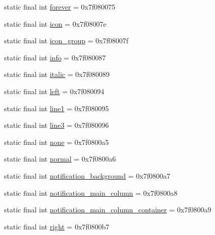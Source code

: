 \begin{DoxyCompactItemize}
static final int \mbox{\hyperlink{classandroid_1_1support_1_1fragment_1_1_r_1_1id_a66b5bab8e16306a04b94937007a15d13}{forever}} = 0x7f080075
\item 
static final int \mbox{\hyperlink{classandroid_1_1support_1_1fragment_1_1_r_1_1id_a5140967d824488b19b7e3ddeffbc0c6b}{icon}} = 0x7f08007e
\item 
static final int \mbox{\hyperlink{classandroid_1_1support_1_1fragment_1_1_r_1_1id_a93c1918d9c372c21ae60794f6cac296d}{icon\+\_\+group}} = 0x7f08007f
\item 
static final int \mbox{\hyperlink{classandroid_1_1support_1_1fragment_1_1_r_1_1id_afebed5e0c4167dc87b4064f20de01931}{info}} = 0x7f080087
\item 
static final int \mbox{\hyperlink{classandroid_1_1support_1_1fragment_1_1_r_1_1id_aeec65cf195be34828b1ce335422650db}{italic}} = 0x7f080089
\item 
static final int \mbox{\hyperlink{classandroid_1_1support_1_1fragment_1_1_r_1_1id_a2b7eed83b3dbdaaed27d285feb20b126}{left}} = 0x7f080094
\item 
static final int \mbox{\hyperlink{classandroid_1_1support_1_1fragment_1_1_r_1_1id_a47bfda58b520f3ab21c3d8ae3c22416d}{line1}} = 0x7f080095
\item 
static final int \mbox{\hyperlink{classandroid_1_1support_1_1fragment_1_1_r_1_1id_a287cdc3b50ba19a14f7fd7ac535f22c8}{line3}} = 0x7f080096
\item 
static final int \mbox{\hyperlink{classandroid_1_1support_1_1fragment_1_1_r_1_1id_ab5d80702f7bd5be78b886703d293bb53}{none}} = 0x7f0800a5
\item 
static final int \mbox{\hyperlink{classandroid_1_1support_1_1fragment_1_1_r_1_1id_a7e6be0bb343837b053b0651abff419f7}{normal}} = 0x7f0800a6
\item 
static final int \mbox{\hyperlink{classandroid_1_1support_1_1fragment_1_1_r_1_1id_a18fa34e0174752772fe13efbc56c9500}{notification\+\_\+background}} = 0x7f0800a7
\item 
static final int \mbox{\hyperlink{classandroid_1_1support_1_1fragment_1_1_r_1_1id_a96fbb522b1122c37fe073a27199a2926}{notification\+\_\+main\+\_\+column}} = 0x7f0800a8
\item 
static final int \mbox{\hyperlink{classandroid_1_1support_1_1fragment_1_1_r_1_1id_ad11dd6bd7529f3257bc7fbca8997f2da}{notification\+\_\+main\+\_\+column\+\_\+container}} = 0x7f0800a9
\item 
static final int \mbox{\hyperlink{classandroid_1_1support_1_1fragment_1_1_r_1_1id_af060f7e6abcb63bfff263a288e8d00c5}{right}} = 0x7f0800b7

\end{DoxyCompactItemize}
